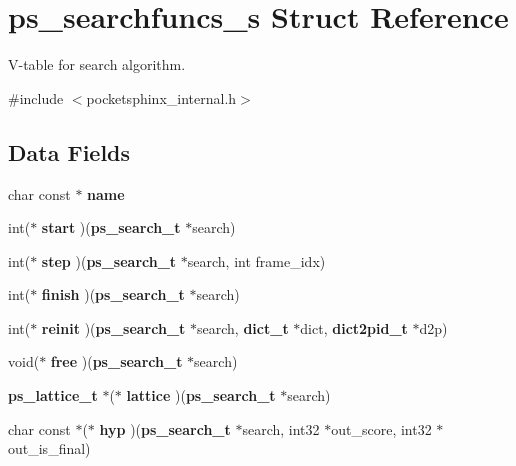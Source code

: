 \section{ps\+\_\+searchfuncs\+\_\+s Struct Reference}
\label{structps__searchfuncs__s}


V-\/table for search algorithm.  




{\ttfamily \#include $<$pocketsphinx\+\_\+internal.\+h$>$}

\subsection*{Data Fields}
\begin{DoxyCompactItemize}
\item 
char const $\ast$ {\bfseries name}\label{structps__searchfuncs__s_a0a227b1bbc134ced7d7980bc873d39d6}

\item 
int($\ast$ {\bfseries start} )({\bf ps\+\_\+search\+\_\+t} $\ast$search)\label{structps__searchfuncs__s_aeba78bc55e0053208a406e5755e328c3}

\item 
int($\ast$ {\bfseries step} )({\bf ps\+\_\+search\+\_\+t} $\ast$search, int frame\+\_\+idx)\label{structps__searchfuncs__s_a5e339a33aaa9abce12aad960ccd8ec69}

\item 
int($\ast$ {\bfseries finish} )({\bf ps\+\_\+search\+\_\+t} $\ast$search)\label{structps__searchfuncs__s_af1b419057d3112ed400b3e8244350298}

\item 
int($\ast$ {\bfseries reinit} )({\bf ps\+\_\+search\+\_\+t} $\ast$search, {\bf dict\+\_\+t} $\ast$dict, {\bf dict2pid\+\_\+t} $\ast$d2p)\label{structps__searchfuncs__s_a6ac3701ff0654da72bd55e89e4936884}

\item 
void($\ast$ {\bfseries free} )({\bf ps\+\_\+search\+\_\+t} $\ast$search)\label{structps__searchfuncs__s_a30c9ebb9036ed7286aba45f3f25abd7e}

\item 
{\bf ps\+\_\+lattice\+\_\+t} $\ast$($\ast$ {\bfseries lattice} )({\bf ps\+\_\+search\+\_\+t} $\ast$search)\label{structps__searchfuncs__s_a94ff0b5cb1ae6660bba5ed3e9886e127}

\item 
char const $\ast$($\ast$ {\bfseries hyp} )({\bf ps\+\_\+search\+\_\+t} $\ast$search, int32 $\ast$out\+\_\+score, int32 $\ast$out\+\_\+is\+\_\+final)\label{structps__searchfuncs__s_a74899805519c49115dd55477312bd3a9}


\end{DoxyCompactItemize}
